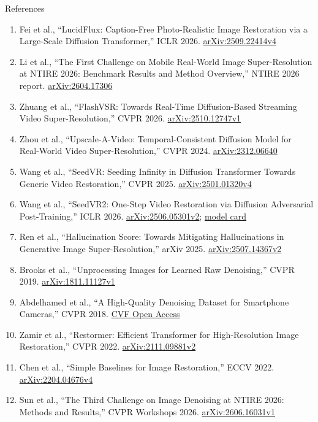 \begin{frame}[allowframebreaks=0.9]{References}
\begin{enumerate}
    \item Fei et al., ``LucidFlux: Caption-Free Photo-Realistic Image Restoration via a Large-Scale Diffusion Transformer,'' ICLR 2026. \href{https://arxiv.org/abs/2509.22414v4}{arXiv:2509.22414v4}
    \item Li et al., ``The First Challenge on Mobile Real-World Image Super-Resolution at NTIRE 2026: Benchmark Results and Method Overview,'' NTIRE 2026 report. \href{https://arxiv.org/abs/2604.17306}{arXiv:2604.17306}
    \item Zhuang et al., ``FlashVSR: Towards Real-Time Diffusion-Based Streaming Video Super-Resolution,'' CVPR 2026. \href{https://arxiv.org/abs/2510.12747v1}{arXiv:2510.12747v1}
    \item Zhou et al., ``Upscale-A-Video: Temporal-Consistent Diffusion Model for Real-World Video Super-Resolution,'' CVPR 2024. \href{https://arxiv.org/abs/2312.06640}{arXiv:2312.06640}
    \item Wang et al., ``SeedVR: Seeding Infinity in Diffusion Transformer Towards Generic Video Restoration,'' CVPR 2025. \href{https://arxiv.org/abs/2501.01320v4}{arXiv:2501.01320v4}
    \item Wang et al., ``SeedVR2: One-Step Video Restoration via Diffusion Adversarial Post-Training,'' ICLR 2026. \href{https://arxiv.org/abs/2506.05301v2}{arXiv:2506.05301v2}; \href{https://huggingface.co/ByteDance-Seed/SeedVR2-3B}{model card}
    \item Ren et al., ``Hallucination Score: Towards Mitigating Hallucinations in Generative Image Super-Resolution,'' arXiv 2025. \href{https://arxiv.org/abs/2507.14367v2}{arXiv:2507.14367v2}
    \item Brooks et al., ``Unprocessing Images for Learned Raw Denoising,'' CVPR 2019. \href{https://arxiv.org/abs/1811.11127v1}{arXiv:1811.11127v1}
    \item Abdelhamed et al., ``A High-Quality Denoising Dataset for Smartphone Cameras,'' CVPR 2018. \href{https://openaccess.thecvf.com/content_cvpr_2018/html/Abdelhamed_A_High-Quality_Denoising_CVPR_2018_paper.html}{CVF Open Access}
    \item Zamir et al., ``Restormer: Efficient Transformer for High-Resolution Image Restoration,'' CVPR 2022. \href{https://arxiv.org/abs/2111.09881v2}{arXiv:2111.09881v2}
    \item Chen et al., ``Simple Baselines for Image Restoration,'' ECCV 2022. \href{https://arxiv.org/abs/2204.04676v4}{arXiv:2204.04676v4}
    \item Sun et al., ``The Third Challenge on Image Denoising at NTIRE 2026: Methods and Results,'' CVPR Workshops 2026. \href{https://arxiv.org/abs/2606.16031v1}{arXiv:2606.16031v1}

\end{enumerate}
\end{frame}
